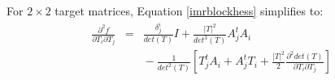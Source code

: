 \documentclass{report}
\begin{document}
For $2 \times 2$ target matrices, Equation \ref{imrblockhess} simplifies to:
\begin{eqnarray}
\frac{\partial^2 f}{\partial T_i \partial T_j}
&=& \frac{\delta^i_j}{det(T)}I + \frac{|T|^2}{det^3(T)} A_j^t A_i \\ \nonumber
& & {} - \frac{1}{det^2(T)} \left[ T_j^t A_i + A_j^t T_i 
+ \frac{|T|^2}{2} \frac{\partial^2 det(T)}{\partial T_i \partial T_j} \right]
\end{eqnarray}
\end{document}
